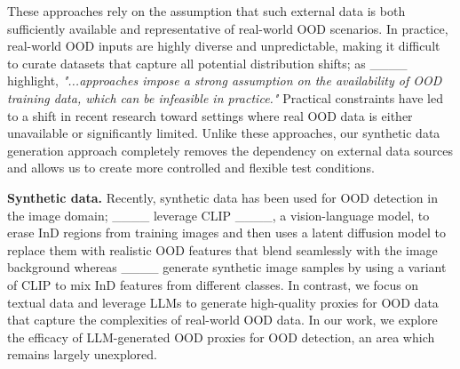 These approaches rely on the assumption that such external data is both sufficiently available and representative of real-world OOD scenarios. In practice, real-world OOD inputs are highly diverse and unpredictable, making it difficult to curate datasets that capture all potential distribution shifts; as ____ highlight, \emph{"...approaches impose a strong assumption on the availability of OOD training data, which can be infeasible in practice."} Practical constraints have led to a shift in recent research toward settings where real OOD data is either unavailable or significantly limited. Unlike these approaches, our synthetic data generation approach completely removes the dependency on external data sources and allows us to create more controlled and flexible test conditions. 


\textbf{Synthetic data.}
Recently, synthetic data has been used for OOD detection in the image domain;  ____ leverage CLIP ____, a vision-language model, to erase InD regions from training images and then uses a latent diffusion model to replace them with realistic OOD features that blend seamlessly with the image background whereas ____ generate synthetic image samples by using a variant of CLIP to mix InD features from different classes.
In contrast, we focus on textual data and leverage LLMs to generate high-quality proxies for OOD data that capture the complexities of real-world OOD data. In our work, we explore the efficacy of LLM-generated OOD proxies for OOD detection, an area which remains largely unexplored.
\vspace{-0.2cm}